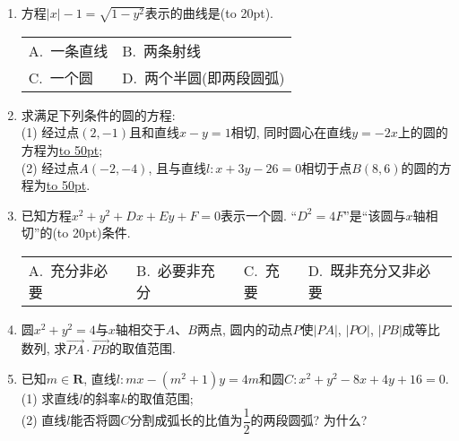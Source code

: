 \documentclass[10pt,a4paper]{article}
\newcommand{\blank}[1]{\underline{\hbox to #1pt{}}}
\newcommand{\bracket}[1]{(\hbox to #1pt{})}
\newcommand{\twoch}[4]{\par\begin{tabular}{p{.46\textwidth}p{.46\textwidth}}
A.~#1& B.~#2\\
C.~#3& D.~#4
\end{tabular}}
\newcommand{\fourch}[4]{\par\begin{tabular}{p{.23\textwidth}p{.23\textwidth}p{.23\textwidth}p{.23\textwidth}}
A.~#1 &B.~#2& C.~#3& D.~#4
\end{tabular}}
\begin{document}
\begin{enumerate}[1.]
\item 方程$|x|-1=\sqrt{1-y^2}$表示的曲线是\bracket{20}.
\twoch{一条直线}{两条射线}{一个圆}{两个半圆(即两段圆弧)}\item 求满足下列条件的圆的方程:\\
(1) 经过点$(2,-1)$且和直线$x-y=1$相切, 同时圆心在直线$y=-2x$上的圆的方程为\blank{50};\\
(2) 经过点$A(-2,-4)$, 且与直线$l:x+3y-26=0$相切于点$B(8,6)$的圆的方程为\blank{50}.
\item 已知方程$x^2+y^2+Dx+Ey+F=0$表示一个圆. ``$D^2=4F$''是``该圆与$x$轴相切''的\bracket{20}条件.
\fourch{充分非必要}{必要非充分}{充要}{既非充分又非必要}\item 圆$x^2+y^2=4$与$x$轴相交于$A$、$B$两点, 圆内的动点$P$使$|PA|$, $|PO|$, $|PB|$成等比数列, 求$\overrightarrow{PA}\cdot \overrightarrow{PB}$的取值范围.
\item 已知$m\in \mathbf{R}$, 直线$l:mx-(m^2+1)y=4m$和圆$C:x^2+y^2-8x+4y+16=0$.\\
(1) 求直线$l$的斜率$k$的取值范围;\\
(2) 直线$l$能否将圆$C$分割成弧长的比值为$\dfrac{1}{2}$的两段圆弧? 为什么?




\end{enumerate}
\end{document}
